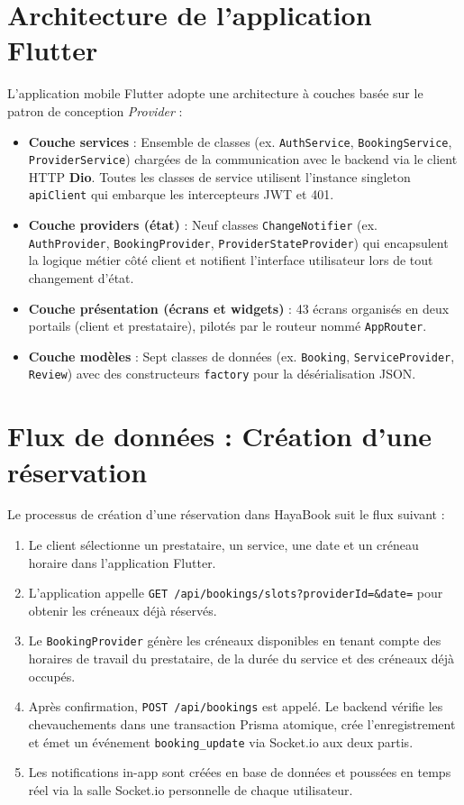 \section{Architecture de l'application Flutter}

L'application mobile Flutter adopte une architecture à couches basée sur le patron de conception \textit{Provider} :

\begin{itemize}
    \item \textbf{Couche services} : Ensemble de classes (ex. \texttt{AuthService}, \texttt{BookingService}, \texttt{ProviderService}) chargées de la communication avec le backend via le client HTTP \textbf{Dio}. Toutes les classes de service utilisent l'instance singleton \texttt{apiClient} qui embarque les intercepteurs JWT et 401.
    \item \textbf{Couche providers (état)} : Neuf classes \texttt{ChangeNotifier} (ex. \texttt{AuthProvider}, \texttt{BookingProvider}, \texttt{ProviderStateProvider}) qui encapsulent la logique métier côté client et notifient l'interface utilisateur lors de tout changement d'état.
    \item \textbf{Couche présentation (écrans et widgets)} : 43 écrans organisés en deux portails (client et prestataire), pilotés par le routeur nommé \texttt{AppRouter}.
    \item \textbf{Couche modèles} : Sept classes de données (ex. \texttt{Booking}, \texttt{ServiceProvider}, \texttt{Review}) avec des constructeurs \texttt{factory} pour la désérialisation JSON.
\end{itemize}

\section{Flux de données : Création d'une réservation}

Le processus de création d'une réservation dans HayaBook suit le flux suivant :

\begin{enumerate}
    \item Le client sélectionne un prestataire, un service, une date et un créneau horaire dans l'application Flutter.
    \item L'application appelle \texttt{GET /api/bookings/slots?providerId=\&date=} pour obtenir les créneaux déjà réservés.
    \item Le \texttt{BookingProvider} génère les créneaux disponibles en tenant compte des horaires de travail du prestataire, de la durée du service et des créneaux déjà occupés.
    \item Après confirmation, \texttt{POST /api/bookings} est appelé. Le backend vérifie les chevauchements dans une transaction Prisma atomique, crée l'enregistrement et émet un événement \texttt{booking\_update} via Socket.io aux deux partis.
    \item Les notifications in-app sont créées en base de données et poussées en temps réel via la salle Socket.io personnelle de chaque utilisateur.
\end{enumerate}


